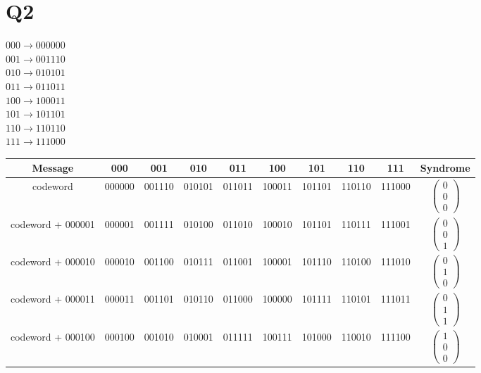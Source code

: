 \documentclass{article}
\begin{document}
\section{Q2}
$000 \rightarrow 000000$\\
$001 \rightarrow 001110$\\
$010 \rightarrow 010101$\\
$011 \rightarrow 011011$\\
$100 \rightarrow 100011$\\
$101 \rightarrow 101101$\\
$110 \rightarrow 110110$\\
$111 \rightarrow 111000$\\
\begin{center}
\begin{tabular}{|c|c c c c c c c c |c|}
\hline
Message & 000 & 001 & 010 & 011 & 100 & 101 & 110 & 111 & Syndrome\\
\hline
codeword               & 000000 & 001110 & 010101 & 011011 & 100011 & 101101 & 110110 & 111000 & $\begin{pmatrix}0\\0\\0\end{pmatrix}$\\
\hline
codeword + 000001 & 000001 & 001111 & 010100 & 011010 & 100010 & 101101 & 110111 & 111001 & $\begin{pmatrix}0\\0\\1\end{pmatrix}$\\
\hline
codeword + 000010 & 000010 & 001100 & 010111 & 011001 & 100001 & 101110 & 110100 & 111010 & $\begin{pmatrix}0\\1\\0\end{pmatrix}$\\
\hline
codeword + 000011 & 000011 & 001101 & 010110 & 011000 & 100000 & 101111 & 110101 & 111011 & $\begin{pmatrix}0\\1\\1\end{pmatrix}$\\
\hline
codeword + 000100 & 000100 & 001010 & 010001 & 011111 & 100111 & 101000 & 110010 & 111100 & $\begin{pmatrix}1\\0\\0\end{pmatrix}$\\

\end{tabular}
\end{center}
\end{document}

